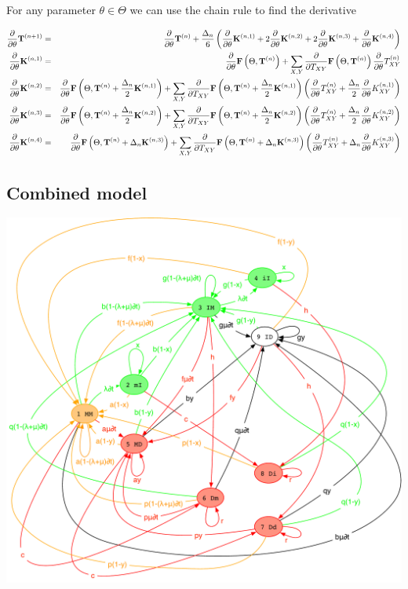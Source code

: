 \documentclass{article}
\begin{document}
For any parameter $\theta \in \Theta$ we can use the chain rule to find the derivative

\newcommand\ptheta{\frac{\partial}{\partial\theta}}
\newcommand\ptxy{\frac{\partial}{\partial T_{XY}}}
\newcommand\allpartials[1]{\ptheta #1 + \sum_{X,Y} \ptxy #1 \ptheta T_{XY}^{(n)}}
\newcommand\allpartialsk[3]{\ptheta #1 + \sum_{X,Y} \ptxy #1 \left( \ptheta T_{XY}^{(n)} + #2 \ptheta K_{XY}^{(n,#3)} \right)}
\begin{eqnarray*}
  \ptheta {\bf T}^{(n+1)} & = & \ptheta {\bf T}^{(n)} + \frac{\Delta_n}{6} \left( \ptheta {\bf K}^{(n,1)} + 2\ptheta{\bf K}^{(n,2)} + 2\ptheta{\bf K}^{(n,3)} + \ptheta{\bf K}^{(n,4)} \right) \\
  \ptheta {\bf K}^{(n,1)} & = & \allpartials{{\bf F}\left(\Theta,{\bf T}^{(n)}\right)} \\
  \ptheta {\bf K}^{(n,2)} & = & \allpartialsk{{\bf F}\left(\Theta,{\bf T}^{(n)} + \frac{\Delta_n}{2} {\bf K}^{(n,1)}\right)}{\frac{\Delta_n}{2}}{1} \\
  \ptheta {\bf K}^{(n,3)} & = & \allpartialsk{{\bf F}\left(\Theta,{\bf T}^{(n)} + \frac{\Delta_n}{2} {\bf K}^{(n,2)}\right)}{\frac{\Delta_n}{2}}{2} \\
  \ptheta {\bf K}^{(n,4)} & = & \allpartialsk{{\bf F}\left(\Theta,{\bf T}^{(n)} + \Delta_n {\bf K}^{(n,3)}\right)}{\Delta_n}{3}
\end{eqnarray*}


\subsection{Combined model}

\includegraphics[width=\textwidth]{PairInstant.pdf}
\end{document}
